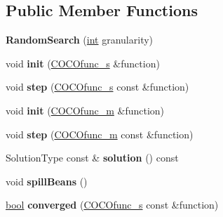 \subsection*{Public Member Functions}
\begin{DoxyCompactItemize}
\item 
{\bfseries Random\+Search} (\hyperlink{classint}{int} granularity)\hypertarget{classRandomSearch_ab960dc42af2fb770e63505d3dc2cb0ac}{}\label{classRandomSearch_ab960dc42af2fb770e63505d3dc2cb0ac}

\item 
void {\bfseries init} (\hyperlink{classCOCOfunc__s}{C\+O\+C\+Ofunc\+\_\+s} \&function)\hypertarget{classRandomSearch_a5a138abca33c8cc685fbadb46eaaea16}{}\label{classRandomSearch_a5a138abca33c8cc685fbadb46eaaea16}

\item 
void {\bfseries step} (\hyperlink{classCOCOfunc__s}{C\+O\+C\+Ofunc\+\_\+s} const \&function)\hypertarget{classRandomSearch_a3396e93dcb278d926cda54491ce62149}{}\label{classRandomSearch_a3396e93dcb278d926cda54491ce62149}

\item 
void {\bfseries init} (\hyperlink{classCOCOfunc__m}{C\+O\+C\+Ofunc\+\_\+m} \&function)\hypertarget{classRandomSearch_a31999b0c9db9c92a6ebf8c2f8e0f9f7f}{}\label{classRandomSearch_a31999b0c9db9c92a6ebf8c2f8e0f9f7f}

\item 
void {\bfseries step} (\hyperlink{classCOCOfunc__m}{C\+O\+C\+Ofunc\+\_\+m} const \&function)\hypertarget{classRandomSearch_a28a685c5fc9bdbed258c80115968734e}{}\label{classRandomSearch_a28a685c5fc9bdbed258c80115968734e}

\item 
Solution\+Type const \& {\bfseries solution} () const \hypertarget{classRandomSearch_a6cc36fcd7885d229a2cd468ac3d69228}{}\label{classRandomSearch_a6cc36fcd7885d229a2cd468ac3d69228}

\item 
void {\bfseries spill\+Beans} ()\hypertarget{classRandomSearch_af94a45868b7bf1737d16a6865529feef}{}\label{classRandomSearch_af94a45868b7bf1737d16a6865529feef}

\item 
\hyperlink{classbool}{bool} {\bfseries converged} (\hyperlink{classCOCOfunc__s}{C\+O\+C\+Ofunc\+\_\+s} const \&function)\hypertarget{classRandomSearch_a63168f515c5ce81ea23637f2119fcb0a}{}\label{classRandomSearch_a63168f515c5ce81ea23637f2119fcb0a}


\end{DoxyCompactItemize}
